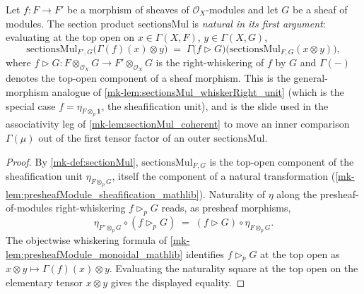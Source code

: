 \begin{lemma}\label{mk-lem:sectionsMul_whiskerRight_natural}
  \leanok

  Let \(f : F \to F'\) be a morphism of sheaves of \(\mathcal{O}_X\)-modules and let
  \(G\) be a sheaf of modules. The section product \(\mathrm{sectionsMul}\) is
  \emph{natural in its first argument}: evaluating at the top open on
  \(x \in \Gamma(X,F)\), \(y \in \Gamma(X,G)\),
  \[
    \mathrm{sectionsMul}_{F',G}\bigl(\Gamma(f)(x) \otimes y\bigr)
      \;=\;
    \Gamma\bigl(f \rhd G\bigr)\bigl(\mathrm{sectionsMul}_{F,G}(x \otimes y)\bigr),
  \]
  where \(f \rhd G : F \otimes_{\mathcal{O}_X} G \to F' \otimes_{\mathcal{O}_X} G\) is
  the right-whiskering of \(f\) by \(G\) and \(\Gamma(-)\) denotes the top-open
  component of a sheaf morphism. This is the general-morphism analogue of
  \ref{mk-lem:sectionsMul_whiskerRight_unit} (which is the special case
  \(f = \eta_{F \otimes_p \mathbf{1}}\), the sheafification unit), and is the slide
  used in the associativity leg of \ref{mk-lem:sectionMul_coherent} to move an inner
  comparison \(\Gamma(\mu)\) out of the first tensor factor of an outer
  \(\mathrm{sectionsMul}\).
\end{lemma}

\begin{proof}
  \leanok
  By \ref{mk-def:sectionMul}, \(\mathrm{sectionsMul}_{F,G}\) is the top-open component of
  the sheafification unit \(\eta_{F \otimes_{p} G}\), itself the component of a natural
  transformation (\ref{mk-lem:presheafModule_sheafification_mathlib}). Naturality of
  \(\eta\) along the presheaf-of-modules right-whiskering \(f \rhd_p G\) reads, as
  presheaf morphisms,
  \[
    \eta_{F' \otimes_p G} \circ (f \rhd_p G)
      \;=\;
    (f \rhd G) \circ \eta_{F \otimes_p G}.
  \]
  The objectwise whiskering formula of \ref{mk-lem:presheafModule_monoidal_mathlib}
  identifies \(f \rhd_p G\) at the top open as
  \(x \otimes y \mapsto \Gamma(f)(x) \otimes y\). Evaluating the naturality square at
  the top open on the elementary tensor \(x \otimes y\) gives the displayed equality.
\end{proof}

